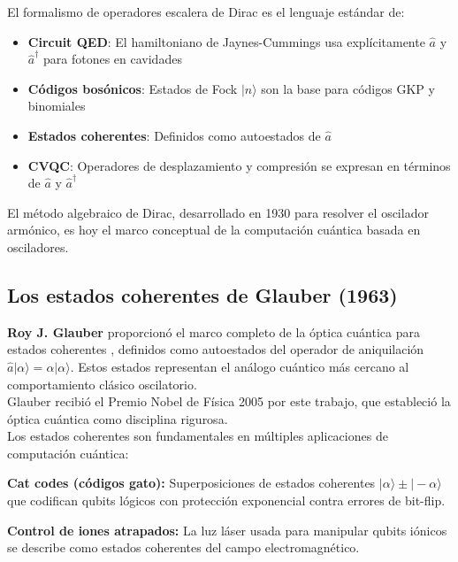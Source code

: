 \documentclass[11pt,a4paper,spanish]{book}
\begin{document}
El formalismo de operadores escalera de Dirac es el lenguaje estándar de:

\begin{itemize}
	\item \textbf{Circuit QED}: El hamiltoniano de Jaynes-Cummings usa explícitamente $\hat{a}$ y $\hat{a}^\dagger$ para fotones en cavidades \citep{blais2021}
	\item \textbf{Códigos bosónicos}: Estados de Fock $|n\rangle$ son la base para códigos GKP y binomiales \citep{gkp2001, michael2016}
	\item \textbf{Estados coherentes}: Definidos como autoestados de $\hat{a}$ \citep{glauber1963a}
	\item \textbf{CVQC}: Operadores de desplazamiento y compresión se expresan en términos de $\hat{a}$ y $\hat{a}^\dagger$ \citep{braunstein2005}
\end{itemize}

El método algebraico de Dirac, desarrollado en 1930 para resolver el oscilador armónico, es hoy el marco conceptual de la computación cuántica basada en osciladores.


\subsection*{Los estados coherentes de Glauber (1963)}
\textbf{Roy J. Glauber} proporcionó el marco completo de la óptica cuántica para estados coherentes \citep{glauber1963a}, definidos como autoestados del operador de aniquilación $\hat{a}|\alpha\rangle = \alpha|\alpha\rangle$. Estos estados representan el análogo cuántico más cercano al comportamiento clásico oscilatorio.\\

Glauber recibió el Premio Nobel de Física 2005 por este trabajo, que estableció la óptica cuántica como disciplina rigurosa.\\


Los estados coherentes son fundamentales en múltiples aplicaciones de computación cuántica:

\textbf{Cat codes (códigos gato):} \citep{ofek2016, reglade2024}
Superposiciones de estados coherentes $|\alpha\rangle \pm |-\alpha\rangle$ que codifican qubits lógicos con protección exponencial contra errores de bit-flip.

\textbf{Control de iones atrapados:} \citep{leibfried2003}
La luz láser usada para manipular qubits iónicos se describe como estados coherentes del campo electromagnético.
\end{document}
